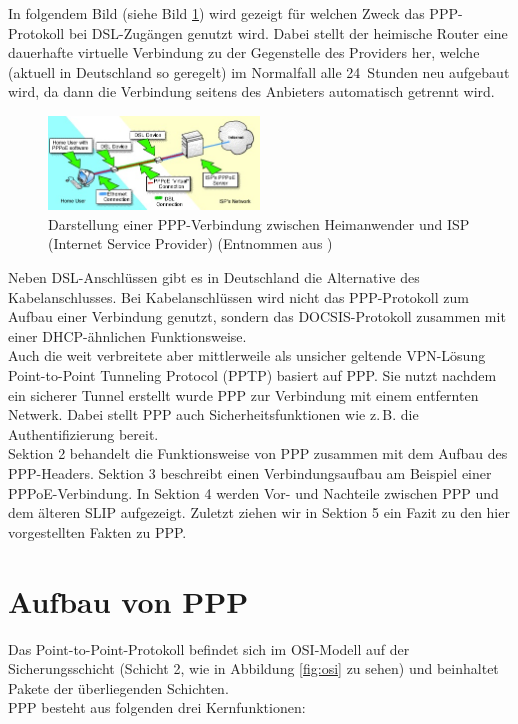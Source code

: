 \documentclass[journal,11pt]{IEEEtran}
\begin{document}
In folgendem Bild (siehe Bild \ref{fig:PPP-Visualisierung}) wird gezeigt f\"ur welchen Zweck das PPP-Protokoll bei DSL-Zug\"angen genutzt wird. Dabei stellt der heimische Router eine dauerhafte virtuelle Verbindung zu der Gegenstelle des Providers her, welche (aktuell in Deutschland so geregelt) im Normalfall alle 24~Stunden neu aufgebaut wird, da dann die Verbindung seitens des Anbieters automatisch getrennt wird. \\
\begin{figure}[h!]
 \centering
  \includegraphics[width=0.5\textwidth]{img/PPP-Visualisierung}
 \caption{Darstellung einer PPP-Verbindung zwischen Heimanwender und ISP (Internet Service Provider) (Entnommen aus \cite{PPP-Bild})}
 \label{fig:PPP-Visualisierung}
\end{figure}
Neben DSL-Anschl\"ussen gibt es in Deutschland die Alternative des Kabelanschlusses. Bei Kabelanschl\"ussen wird nicht das PPP-Protokoll zum Aufbau einer Verbindung genutzt, sondern das DOCSIS-Protokoll zusammen mit einer DHCP-\"ahnlichen \cite{RFC3256} Funktionsweise. \\
Auch die weit verbreitete aber mittlerweile als unsicher geltende VPN-Lösung Point-to-Point Tunneling Protocol (PPTP) basiert auf PPP. Sie nutzt nachdem ein sicherer Tunnel erstellt wurde PPP zur Verbindung mit einem entfernten Netwerk. Dabei stellt PPP auch Sicherheitsfunktionen wie z.\,B. die Authentifizierung bereit.
\\
\newline
Sektion 2 behandelt die Funktionsweise von PPP zusammen mit dem Aufbau des PPP-Headers. Sektion 3 beschreibt einen Verbindungsaufbau am Beispiel einer PPPoE-Verbindung. In Sektion 4 werden Vor- und Nachteile zwischen PPP und dem \"alteren SLIP aufgezeigt. Zuletzt ziehen wir in Sektion 5 ein Fazit zu den hier vorgestellten Fakten zu PPP.



\section{Aufbau von PPP}
Das Point-to-Point-Protokoll befindet sich im OSI-Modell auf der Sicherungsschicht (Schicht 2, wie in Abbildung \ref{fig:osi} zu sehen) und beinhaltet Pakete der überliegenden Schichten.\\
PPP besteht aus folgenden drei Kernfunktionen:
\end{document}
